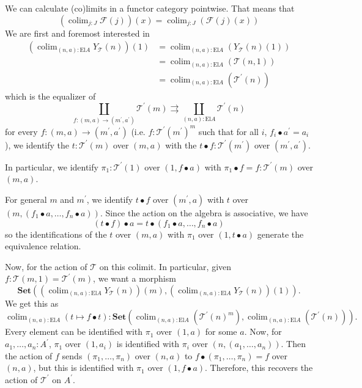 \documentclass{amsbook}
\newcommand{\Catb}[1]{\mathbf{#1}}
\newcommand{\SET}{\Catb{Set}}
\newcommand{\Hom}[3]{{#1}\left(#2,#3\right)}
\theoremstyle{definition}
\begin{document}
  We can calculate (co)limits in a functor category pointwise. That means that
  \[ (\mathop{colim}_{j : J} \mathcal F(j))(x) = \mathop{colim}_{j : J} (\mathcal F(j)(x)) \]
  We are first and foremost interested in
  \begin{align*}
    \left(\mathop{colim}_{(n, a) : \mathrm{El} A} Y_{\mathcal T}(n)\right)(1)
    &= \mathop{colim}_{(n, a) : \mathrm{El} A} (Y_{\mathcal T}(n)(1))\\
    &= \mathop{colim}_{(n, a) : \mathrm{El} A} (\mathcal T(n, 1))\\
    &= \mathop{colim}_{(n, a) : \mathrm{El} A} (\mathcal T^\prime(n))
  \end{align*}
  which is the equalizer of
  \[ \coprod_{f: (m, a) \to (m^\prime, a^\prime)} \mathcal T^\prime(m) \rightrightarrows \coprod_{(n, a) : \mathrm{El} A} \mathcal T^\prime(n) \]
  for every $ f: (m, a) \to (m^\prime, a^\prime) $ (i.e. $ f: \mathcal T^\prime(m^\prime)^m $ such that for all $ i $, $ f_i \bullet a^\prime = a_i $), we identify the $ t : \mathcal T^\prime(m) $ over $ (m, a) $ with the $ t \bullet f : \mathcal T^\prime(m^\prime) $ over $ (m^\prime, a^\prime) $.

  In particular, we identify $ \pi_1 : \mathcal T^\prime(1) $ over $ (1, f \bullet a) $ with $ \pi_1 \bullet f = f : \mathcal T^\prime(m) $ over $ (m, a) $.

  For general $ m $ and $ m^\prime $, we identify $ t \bullet f $ over $ (m^\prime, a) $ with $ t $ over $ (m, (f_1 \bullet a, \dots, f_n \bullet a)) $. Since the action on the algebra is associative, we have
  \[ (t \bullet f) \bullet a = t \bullet (f_1 \bullet a, \dots, f_n \bullet a) \]
  so the identifications of the $ t $ over $ (m, a) $ with $ \pi_1 $ over $ (1, t \bullet a) $ generate the equivalence relation.

  Now, for the action of $ \mathcal T $ on this colimit. In particular, given $ f: \Hom{\mathcal T}{m}{1} = \mathcal T^\prime(m) $, we want a morphism
  \[ \Hom{\SET}{\left(\mathop{colim}_{(n, a) : \mathrm{El} A} Y_{\mathcal T}(n)\right)(m)}{\left(\mathop{colim}_{(n, a) : \mathrm{El} A} Y_{\mathcal T}(n)\right)(1)}. \]
  We get this as
  \[ \mathop{colim}_{(n, a) : \mathrm{El} A} (t \mapsto f \bullet t): \Hom{\SET}{\mathop{colim}_{(n, a) : \mathrm{El} A} (\mathcal T^\prime(n)^m)}{\mathop{colim}_{(n, a) : \mathrm{El} A} (\mathcal T^\prime(n))}. \]
  Every element can be identified with $ \pi_1 $ over $ (1, a) $ for some $ a $. Now, for $ a_1, \dots, a_n: A^\prime $, $ \pi_1 $ over $ (1, a_i) $ is identified with $ \pi_i $ over $ (n, (a_1, \dots, a_n)) $. Then the action of $ f $ sends $ (\pi_1, \dots, \pi_n) $ over $ (n, a) $ to $ f \bullet (\pi_1, \dots, \pi_n) = f $ over $ (n, a) $, but this is identified with $ \pi_1 $ over $ (1, f \bullet a) $. Therefore, this recovers the action of $ \mathcal T^\prime $ on $ A^\prime $.
\end{document}
